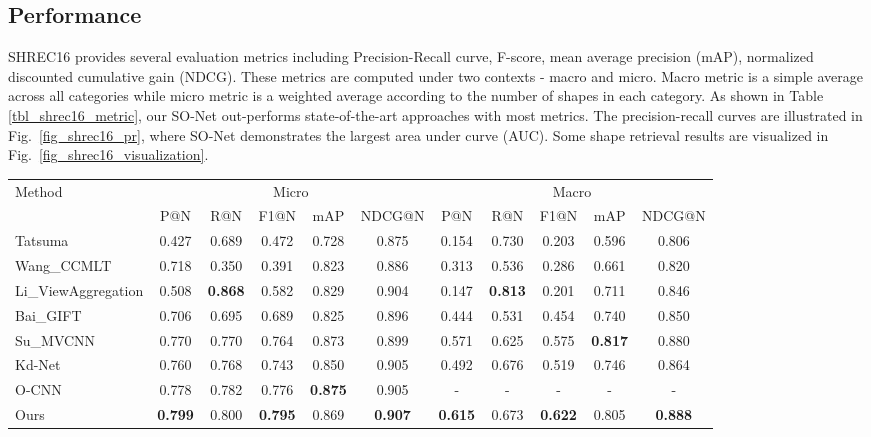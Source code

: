 \documentclass[10pt,twocolumn,letterpaper]{article}
\begin{document}
\subsection{Performance}
SHREC16 provides several evaluation metrics including Precision-Recall curve, F-score, mean average precision (mAP), normalized discounted cumulative gain (NDCG). These metrics are computed under two contexts - macro and micro. Macro metric is a simple average across all categories while micro metric is a weighted average according to the number of shapes in each category. As shown in Table \ref{tbl_shrec16_metric}, our SO-Net out-performs state-of-the-art approaches with most metrics. The precision-recall curves are illustrated in Fig.~\ref{fig_shrec16_pr}, where SO-Net demonstrates the largest area under curve (AUC).
Some shape retrieval results are visualized in Fig.~\ref{fig_shrec16_visualization}.

\begin{table*}[t]
\centering
{
\setlength\tabcolsep{5pt} \begin{tabular}{l|ccccc|ccccc}
\hline
\multirow{2}{*}{Method}   & \multicolumn{5}{c|}{Micro}                                        & \multicolumn{5}{c}{Macro}             \\
                          & P@N   & R@N   & F1@N  & mAP   & NDCG@N                            & P@N   & R@N   & F1@N  & mAP   & NDCG@N \\ \hline
Tatsuma                   & 0.427 & 0.689 & 0.472 & 0.728 & 0.875                             & 0.154 & 0.730 & 0.203 & 0.596 & 0.806  \\
Wang\_CCMLT               & 0.718 & 0.350 & 0.391 & 0.823 & 0.886                             & 0.313 & 0.536 & 0.286 & 0.661 & 0.820  \\
Li\_ViewAggregation       & 0.508 & \textbf{0.868} & 0.582 & 0.829 & 0.904                    & 0.147 & \textbf{0.813} & 0.201 & 0.711 & 0.846  \\
Bai\_GIFT \cite{bai2016gift} & 0.706 & 0.695 & 0.689 & 0.825 & 0.896                             & 0.444 & 0.531 & 0.454 & 0.740 & 0.850  \\
Su\_MVCNN \cite{su2015multi} & 0.770 & 0.770 & 0.764 & 0.873 & 0.899                          & 0.571 & 0.625 & 0.575 & \textbf{0.817} & 0.880  \\
Kd-Net \cite{klokov2017escape} & 0.760 & 0.768 & 0.743 & 0.850 & 0.905                        & 0.492 & 0.676 & 0.519 & 0.746 & 0.864  \\
O-CNN \cite{wang2017cnn}     & 0.778 & 0.782 & 0.776 & \textbf{0.875} & 0.905                 & -     & -     & -     & -     & -      \\ \hline
Ours                      & \textbf{0.799} & 0.800 & \textbf{0.795} & 0.869 & \textbf{0.907}  & \textbf{0.615} & 0.673 & \textbf{0.622} & 0.805 & \textbf{0.888}  \\ \hline
\end{tabular}
}
\caption{3D shape retrieval results with SHREC16. Our SO-Net out-performs state-of-the-art deep networks with most metrics.}
\label{tbl_shrec16_metric}
\end{table*}
\end{document}

